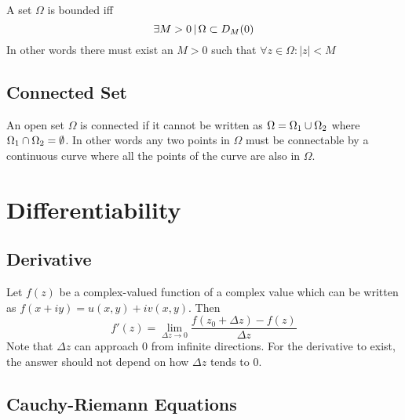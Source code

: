 \documentclass[a4paper]{article}
\begin{document}
A set \(\Omega\) is bounded iff
\[
    \exists M>0 \,|\, \Omega \subset D_M(0)
\]
In other words there must exist an \(M>0\) such that \(\forall z\in \Omega:|z|<M\)

\subsection{Connected Set}

An open set \(\Omega\) is connected if it cannot be written as
\(\Omega=\Omega_1 \cup \Omega_2\) where \(\Omega_1 \cap \Omega_2 = \emptyset\).
In other words any two points in \(\Omega\) must be connectable by a continuous
curve where all the points of the curve are also in \(\Omega\).


\pagebreak

\section{Differentiability}

\subsection{Derivative}

Let \(f(z)\) be a complex-valued function
of a complex value which can be written as
\(f(x+iy)=u(x,y)+iv(x,y)\). Then
\[
    f'(z) = \lim_{\Delta z \to 0} \frac{f(z_0 + \Delta z)-f(z)}{\Delta z}
\]
Note that \(\Delta z\) can approach \(0\) from
infinite directions.
For the derivative to exist, the answer
should not depend on how \(\Delta z\) tends to 0.

\subsection{Cauchy-Riemann Equations}
\end{document}
